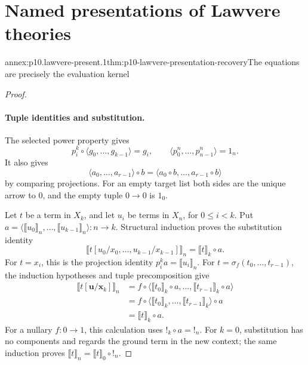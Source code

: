 
\section{Named presentations of Lawvere theories}

\begin{annexitem}{annex:p10.lawvere-present.1}{thm:p10-lawvere-presentation-recovery}{The equations are precisely the evaluation kernel}
\begin{proof}
\paragraph{Tuple identities and substitution.}
The selected power property gives
\[
 p_i^k\circ\langle g_0,\ldots,g_{k-1}\rangle=g_i,\qquad
                 \langle p_0^n,\ldots,p_{n-1}^n\rangle=1_n.
\]
It also gives
\[
 \langle a_0,\ldots,a_{r-1}\rangle\circ b
                 =\langle a_0\circ b,\ldots,a_{r-1}\circ b\rangle
\]
by comparing projections.  For an empty target list both sides
are the unique arrow to \(0\), and the empty tuple \(0\to0\)
is \(1_0\).

Let \(t\) be a term in \(X_k\), and let \(u_i\) be terms in
\(X_n\), for \(0\leq i<k\).  Put
\(a=\langle\llbracket u_0\rrbracket_n,\ldots,\llbracket u_{k-1}\rrbracket_n\rangle:n\to k\).
Structural induction proves the substitution identity
\[
          \bigl\llbracket t[u_0/x_0,\ldots,u_{k-1}/x_{k-1}]\bigr\rrbracket_n
                            =\llbracket t\rrbracket_k\circ a.
\]
For \(t=x_i\), this is the projection identity \(p_i^k a=\llbracket u_i\rrbracket_n\).
For \(t=\sigma_f(t_0,\ldots,t_{r-1})\), the induction hypotheses
and tuple precomposition give
\[
\begin{aligned}
 \bigl\llbracket t[\mathbf u/\mathbf x_k]\bigr\rrbracket_n
   &=f\circ\langle\llbracket t_0\rrbracket_k\circ a,\ldots,
                              \llbracket t_{r-1}\rrbracket_k\circ a\rangle\\
   &=f\circ\langle\llbracket t_0\rrbracket_k,\ldots,
                                  \llbracket t_{r-1}\rrbracket_k\rangle\circ a\\
   &=\llbracket t\rrbracket_k\circ a.
\end{aligned}
\]
For a nullary \(f:0\to1\), this calculation uses
\(!_k\circ a=!_n\).
For \(k=0\), substitution has no components and regards the
ground term in the new context; the same induction proves
\(\llbracket t\rrbracket_n=\llbracket t\rrbracket_0\circ!_n\).


\end{proof}
\end{annexitem}
